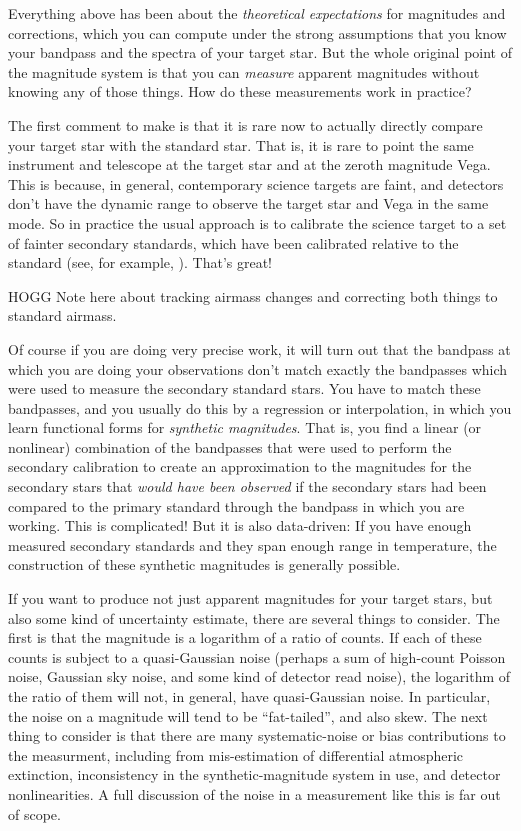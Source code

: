 \documentclass[10pt]{article}
\begin{document}
Everything above has been about the \emph{theoretical expectations} for magnitudes and corrections, which you can compute under the strong assumptions that you know your bandpass and the spectra of your target star.
But the whole original point of the magnitude system is that you can \emph{measure} apparent magnitudes without knowing any of those things.
How do these measurements work in practice?

The first comment to make is that it is rare now to actually directly compare your target star with the standard star.
That is, it is rare to point the same instrument and telescope at the target star and at the zeroth magnitude Vega.
This is because, in general, contemporary science targets are faint, and detectors don't have the dynamic range to observe the target star and Vega in the same mode.
So in practice the usual approach is to calibrate the science target to a set of fainter secondary standards, which have been calibrated relative to the standard (see, for example, \cite{landolt}).
That's great!

HOGG Note here about tracking airmass changes and correcting both things to standard airmass.

Of course if you are doing very precise work, it will turn out that the bandpass at which you are doing your observations don't match exactly the bandpasses which were used to measure the secondary standard stars.
You have to match these bandpasses, and you usually do this by a regression or interpolation, in which you learn functional forms for \emph{synthetic magnitudes}.
That is, you find a linear (or nonlinear) combination of the bandpasses that were used to perform the secondary calibration to create an approximation to the magnitudes for the secondary stars that \emph{would have been observed} if the secondary stars had been compared to the primary standard through the bandpass in which you are working.
This is complicated! But it is also data-driven: If you have enough measured secondary standards and they span enough range in temperature, the construction of these synthetic magnitudes is generally possible.

If you want to produce not just apparent magnitudes for your target stars, but also some kind of uncertainty estimate, there are several things to consider.
The first is that the magnitude is a logarithm of a ratio of counts.
If each of these counts is subject to a quasi-Gaussian noise (perhaps a sum of high-count Poisson noise, Gaussian sky noise, and some kind of detector read noise), the logarithm of the ratio of them will not, in general, have quasi-Gaussian noise.
In particular, the noise on a magnitude will tend to be ``fat-tailed'', and also skew.
The next thing to consider is that there are many systematic-noise or bias contributions to the measurment, including from mis-estimation of differential atmospheric extinction, inconsistency in the synthetic-magnitude system in use, and detector nonlinearities.
A full discussion of the noise in a measurement like this is far out of scope.
\end{document}
